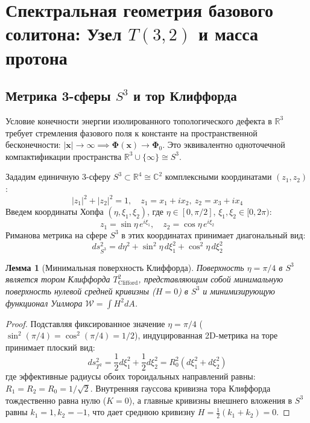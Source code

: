 \documentclass[12pt,a4paper]{article}
\newtheorem{lemma}{Лемма}
\begin{document}
\section{Спектральная геометрия базового солитона: Узел $T(3,2)$ и масса протона}

\subsection{Метрика 3-сферы $S^3$ и тор Клиффорда}
Условие конечности энергии изолированного топологического дефекта в $\mathbb{R}^3$ требует стремления фазового поля к константе на пространственной бесконечности: $|\mathbf{x}| \to \infty \implies \boldsymbol{\Phi}(\mathbf{x}) \to \boldsymbol{\Phi}_0$. Это эквивалентно одноточечной компактификации пространства $\mathbb{R}^3 \cup \{\infty\} \cong S^3$.

Зададим единичную 3-сферу $S^3 \subset \mathbb{R}^4 \cong \mathbb{C}^2$ комплексными координатами $(z_1, z_2)$:
\begin{equation}
	|z_1|^2 + |z_2|^2 = 1, \quad z_1 = x_1 + i x_2, \ z_2 = x_3 + i x_4
\end{equation}
Введем координаты Хопфа $(\eta, \xi_1, \xi_2)$, где $\eta \in [0, \pi/2]$, $\xi_1, \xi_2 \in [0, 2\pi)$:
\begin{equation}
	z_1 = \sin\eta \, e^{i\xi_1}, \quad z_2 = \cos\eta \, e^{i\xi_2}
\end{equation}
Риманова метрика на сфере $S^3$ в этих координатах принимает диагональный вид:
\begin{equation}
	ds^2_{S^3} = d\eta^2 + \sin^2\eta \, d\xi_1^2 + \cos^2\eta \, d\xi_2^2
\end{equation}

\begin{lemma}[Минимальная поверхность Клиффорда]
	Поверхность $\eta = \pi/4$ в $S^3$ является тором Клиффорда $T^2_{\mathrm{Clifford}}$, представляющим собой минимальную поверхность нулевой средней кривизны ($H=0$) в $S^3$ и минимизирующую функционал Уилмора $\mathcal{W} = \int H^2 dA$.
\end{lemma}

\begin{proof}
	Подставляя фиксированное значение $\eta = \pi/4$ ($\sin^2(\pi/4) = \cos^2(\pi/4) = 1/2$), индуцированная 2D-метрика на торе принимает плоский вид:
	\begin{equation}
		ds^2_{T^2} = \frac{1}{2} d\xi_1^2 + \frac{1}{2} d\xi_2^2 = R_0^2 (d\xi_1^2 + d\xi_2^2)
	\end{equation}
	где эффективные радиусы обоих тороидальных направлений равны: $R_1 = R_2 = R_0 = 1/\sqrt{2}$. Внутренняя гауссова кривизна тора Клиффорда тождественно равна нулю ($K=0$), а главные кривизны внешнего вложения в $S^3$ равны $k_1 = 1, k_2 = -1$, что дает среднюю кривизну $H = \frac{1}{2}(k_1 + k_2) = 0$.
\end{proof}
\end{document}
